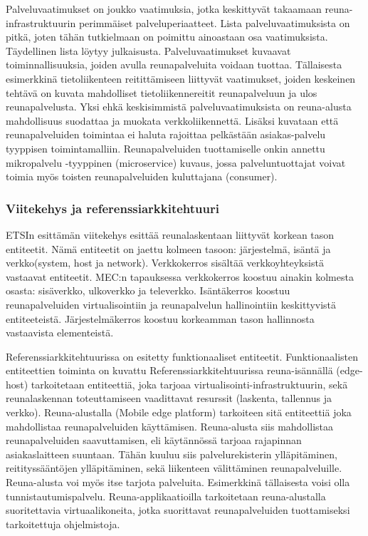 Palveluvaatimukset on joukko vaatimuksia, jotka keskittyvät takaamaan reuna-infrastruktuurin perimmäiset palveluperiaatteet.
Lista palveluvaatimuksista on pitkä, joten tähän tutkielmaan on poimittu ainoastaan osa vaatimuksista. Täydellinen lista löytyy \cite{etsitechreq} julkaisusta.
Palveluvaatimukset kuvaavat toiminnallisuuksia, joiden avulla reunapalveluita voidaan tuottaa. Tällaisesta esimerkkinä tietoliikenteen reitittämiseen liittyvät vaatimukset, joiden keskeinen tehtävä on kuvata mahdolliset tietoliikennereitit reunapalveluun ja ulos reunapalvelusta. Yksi ehkä keskisimmistä palveluvaatimuksista on reuna-alusta mahdollisuus suodattaa ja muokata verkkoliikennettä. 
Lisäksi kuvataan että reunapalveluiden toimintaa ei haluta rajoittaa pelkästään asiakas-palvelu tyyppisen toimintamalliin. Reunapalveluiden tuottamiselle onkin annettu mikropalvelu -tyyppinen (microservice) kuvaus, jossa palveluntuottajat voivat toimia myös toisten reunapalveluiden kuluttajana (consumer).

\subsubsection{Viitekehys ja referenssiarkkitehtuuri}

ETSIn esittämän viitekehys esittää reunalaskentaan liittyvät korkean tason entiteetit. Nämä entiteetit on jaettu kolmeen tasoon: järjestelmä, isäntä ja verkko(system, host ja network). 
Verkkokerros sisältää verkkoyhteyksistä vastaavat entiteetit. MEC:n tapauksessa verkkokerros koostuu ainakin kolmesta osasta: sisäverkko, ulkoverkko ja televerkko.
Isäntäkerros koostuu reunapalveluiden virtualisointiin ja reunapalvelun hallinointiin keskittyvistä entiteeteistä.
Järjestelmäkerros koostuu korkeamman tason hallinnosta vastaavista elementeistä.

Referenssiarkkitehtuurissa on esitetty funktionaaliset entiteetit. Funktionaalisten entiteettien toiminta on kuvattu 
Referenssiarkkitehtuurissa reuna-isännällä (edge-host) tarkoitetaan entiteettiä, joka tarjoaa virtualisointi-infrastruktuurin, sekä reunalaskennan toteuttamiseen vaadittavat resurssit (laskenta, tallennus ja verkko).
Reuna-alustalla (Mobile edge platform) tarkoiteen sitä entiteettiä joka mahdollistaa reunapalveluiden käyttämisen. Reuna-alusta siis mahdollistaa reunapalveluiden saavuttamisen, eli käytännössä tarjoaa rajapinnan asiakaslaitteen suuntaan. Tähän kuuluu siis palvelurekisterin ylläpitäminen, reitityssääntöjen ylläpitäminen, sekä liikenteen välittäminen reunapalveluille. Reuna-alusta voi myös itse tarjota  palveluita.
Esimerkkinä tällaisesta voisi olla tunnistautumispalvelu. 
Reuna-applikaatioilla tarkoitetaan reuna-alustalla suoritettavia virtuaalikoneita, jotka suorittavat reunapalveluiden tuottamiseksi tarkoitettuja ohjelmistoja.

